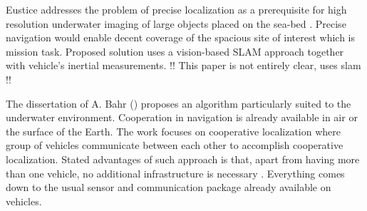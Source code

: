 Eustice addresses the problem of precise localization as a prerequisite for high resolution underwater imaging of large objects placed on the sea-bed \cite{eustice05}. Precise navigation would enable decent coverage of the spacious site of interest which is mission task. Proposed solution uses a vision-based SLAM approach together with vehicle's inertial measurements. !! This paper is not entirely clear, uses slam !!


The dissertation of A. Bahr (\cite{bahr08}) proposes an algorithm particularly suited to the underwater environment. Cooperation in navigation is already available in air or the surface of the Earth. The work focuses on cooperative localization where group of vehicles communicate between each other to accomplish cooperative localization. Stated advantages of such approach is that, apart from having more than one vehicle, no additional infrastructure is necessary \cite{bahr08}. Everything comes down to the usual sensor and communication package already available on vehicles\cite{bahr08}. 